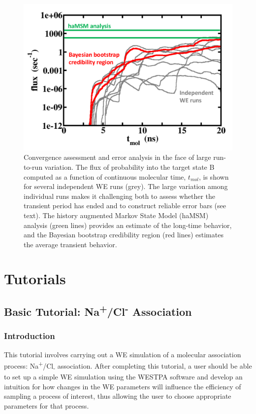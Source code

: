 \documentclass[9pt,tutorial,pubversion]{livecoms}
\begin{document}
\begin{figure}
\includegraphics[width=\linewidth]{Figure3.png}
\caption{Convergence assessment and error analysis in the face of large run-to-run variation. 
The flux of probability into the target state B computed as a function of continuous molecular time, $t_{mol}$, is shown for several independent WE runs (grey). 
The large variation among individual runs makes it challenging both to assess whether the transient period has ended and to construct reliable error bars (see text). 
The history augmented Markov State Model (haMSM) analysis (green lines) provides an estimate of the long-time behavior, and the Bayesian bootstrap credibility region (red lines) estimates the average transient behavior.}
\label{fig:view}
\end{figure}

\section{Tutorials}

\subsection{Basic Tutorial: Na\textsuperscript{+}/Cl\textsuperscript{-} Association}

\subsubsection{Introduction}

This tutorial involves carrying out a WE simulation of a molecular association process: Na\textsuperscript{+}/Cl\textsubscript{-} association. 
After completing this tutorial, a user should be able to set up a simple WE simulation using the WESTPA software and develop an intuition for how changes in the WE parameters will influence the efficiency of sampling a process of interest, thus allowing the user to choose appropriate parameters for that process.
\end{document}
